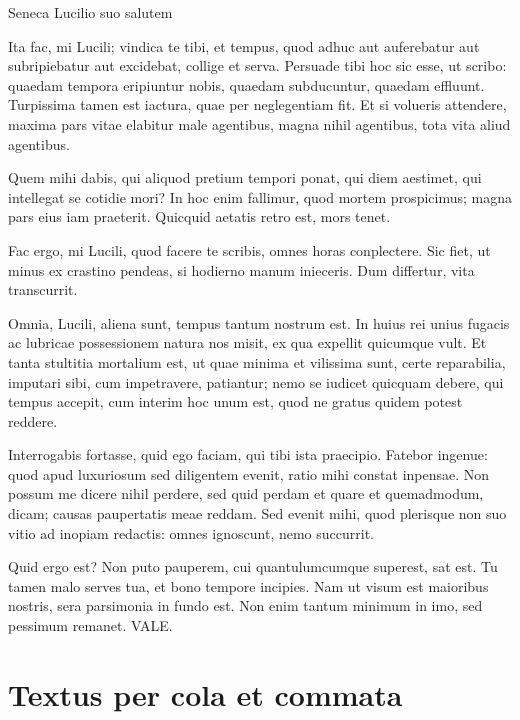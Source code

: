 {\large
\noindent Seneca Lucilio suo salutem

\medskip


\noindent Ita fac, mi Lucili; vindica te tibi, et tempus, quod adhuc aut auferebatur aut subripiebatur aut excidebat, collige et serva. Persuade tibi hoc sic esse, ut scribo: quaedam tempora eripiuntur nobis, quaedam subducuntur, quaedam effluunt. Turpissima tamen est iactura, quae per neglegentiam fit. Et si volueris attendere, maxima pars vitae elabitur male agentibus, magna nihil agentibus, tota vita aliud agentibus.

Quem mihi dabis, qui aliquod pretium tempori ponat, qui diem aestimet, qui intellegat se cotidie mori? In hoc enim fallimur, quod mortem prospicimus; magna pars eius iam praeterit. Quicquid aetatis retro est, mors tenet.

Fac ergo, mi Lucili, quod facere te scribis, omnes horas conplectere. Sic fiet, ut minus ex crastino pendeas, si hodierno manum inieceris. Dum  differtur, vita transcurrit.

Omnia, Lucili, aliena sunt, tempus tantum nostrum est. In huius rei unius fugacis ac lubricae possessionem natura nos misit, ex qua expellit quicumque vult. Et tanta stultitia mortalium est, ut quae minima et vilissima sunt, certe reparabilia, imputari sibi, cum impetravere, patiantur; nemo se iudicet quicquam debere, qui tempus accepit, cum interim hoc unum est, quod ne gratus quidem potest reddere.

Interrogabis fortasse, quid ego faciam, qui tibi ista praecipio. Fatebor ingenue: quod apud luxuriosum sed diligentem evenit, ratio mihi constat inpensae. Non possum me dicere nihil perdere, sed quid perdam et quare et quemadmodum, dicam; causas paupertatis meae reddam. Sed evenit mihi, quod plerisque non suo vitio ad inopiam redactis: omnes ignoscunt, nemo succurrit.

Quid ergo est? Non puto pauperem, cui quantulumcumque superest, sat est. Tu tamen malo serves tua, et bono tempore incipies. Nam ut visum est maioribus nostris, sera parsimonia in fundo est. Non enim tantum minimum in imo, sed pessimum remanet. VALE.

}


\section*{Textus per cola et commata}


